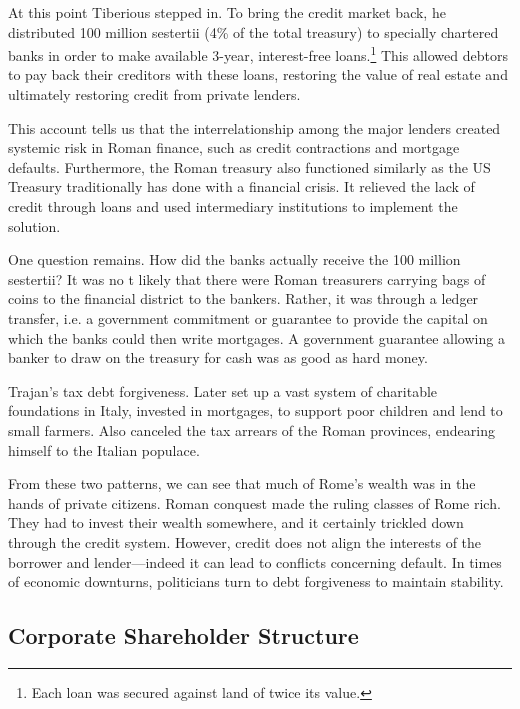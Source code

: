 \documentclass{article}
\begin{document}
      At this point Tiberious stepped in. To bring the credit market back, he distributed 100 million sestertii (4\% of the total treasury) to specially chartered banks in order to make available 3-year, interest-free loans.\footnote{Each loan was secured against land of twice its value.} This allowed debtors to pay back their creditors with these loans, restoring the value of real estate and ultimately restoring credit from private lenders. 

      This account tells us that the interrelationship among the major lenders created systemic risk in Roman finance, such as credit contractions and mortgage defaults. Furthermore, the Roman treasury also functioned similarly as the US Treasury traditionally has done with a financial crisis. It relieved the lack of credit through loans and used intermediary institutions to implement the solution. 
      
      One question remains. How did the banks actually receive the 100 million sestertii? It was no t likely that there were Roman treasurers carrying bags of coins to the financial district to the bankers. Rather, it was through a ledger transfer, i.e. a government commitment or guarantee to provide the capital on which the banks could then write mortgages. A government guarantee allowing a banker to draw on the treasury for cash was as good as hard money. 

      \begin{example}
        \label{ex:trajan-financial-bailout-in-101-ce}
        Trajan's tax debt forgiveness. Later set up a vast system of charitable foundations in Italy, invested in mortgages, to support poor children and lend to small farmers. Also canceled the tax arrears of the Roman provinces, endearing himself to the Italian populace. 
      \end{example}

      From these two patterns, we can see that much of Rome's wealth was in the hands of private citizens. Roman conquest made the ruling classes of Rome rich. They had to invest their wealth somewhere, and it certainly trickled down through the credit system. However, credit does not align the interests of the borrower and lender—indeed it can lead to conflicts concerning default. In times of economic downturns, politicians turn to debt forgiveness to maintain stability.

  \subsection{Corporate Shareholder Structure}
\end{document}
